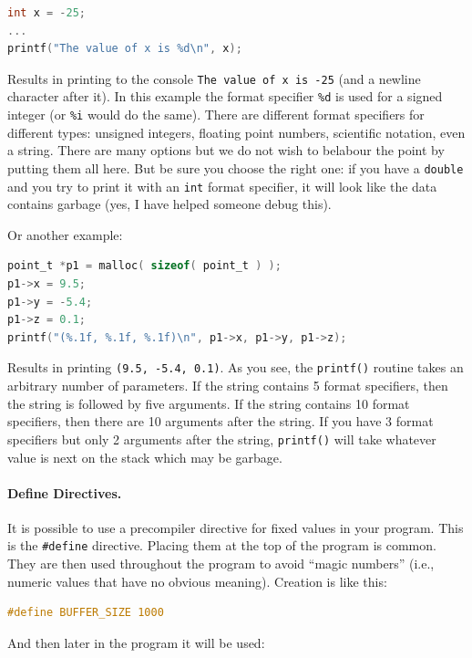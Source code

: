 \begin{lstlisting}[language=C]
int x = -25;
...
printf("The value of x is %d\n", x);
\end{lstlisting}

Results in printing to the console \texttt{The value of x is -25} (and a newline character after it). In this example the format specifier \texttt{\%d} is used for a signed integer (or \texttt{\%i} would do the same). There are different format specifiers for different types: unsigned integers, floating point numbers, scientific notation, even a string. There are many options but we do not wish to belabour the point by putting them all here. But be sure you choose the right one: if you have a \texttt{double} and you try to print it with an \texttt{int} format specifier, it will look like the data contains garbage (yes, I have helped someone debug this).

Or another example:
\begin{lstlisting}[language=C]
point_t *p1 = malloc( sizeof( point_t ) );
p1->x = 9.5;
p1->y = -5.4;
p1->z = 0.1;
printf("(%.1f, %.1f, %.1f)\n", p1->x, p1->y, p1->z);
\end{lstlisting}

Results in printing \texttt{(9.5, -5.4, 0.1)}. As you see, the \texttt{printf()} routine takes an arbitrary number of parameters. If the string contains 5 format specifiers, then the string is followed by five arguments. If the string contains 10 format specifiers, then there are 10 arguments after the string. If you have 3 format specifiers but only 2 arguments after the string, \texttt{printf()} will take whatever value is next on the stack which may be garbage.

\paragraph{Define Directives.}

It is possible to use a precompiler directive for fixed values in your program. This is the \texttt{\#define} directive. Placing them at the top of the program is common. They are then used throughout the program to avoid ``magic numbers'' (i.e., numeric values that have no obvious meaning). Creation is like this:

\begin{lstlisting}[language=C]
#define BUFFER_SIZE 1000
\end{lstlisting}

And then later in the program it will be used:

